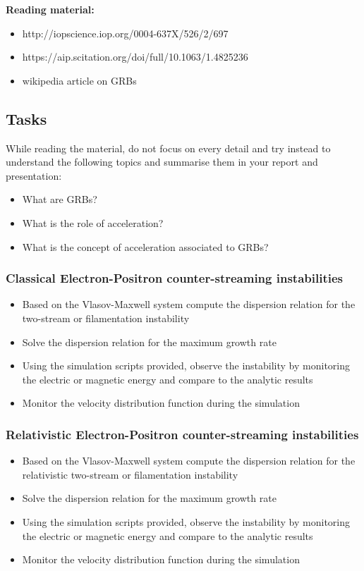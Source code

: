 \documentclass[11pt]{article}
\begin{document}
\textbf{Reading material:}
\begin{itemize}
\item http://iopscience.iop.org/0004-637X/526/2/697
\item https://aip.scitation.org/doi/full/10.1063/1.4825236
\item wikipedia article on GRBs
\end{itemize}

\subsection{Tasks}

While reading the material, do not focus on every detail and try instead to 
understand the following topics and summarise them in your report and presentation:
\begin{itemize}
\item What are GRBs?
\item What is the role of acceleration?
\item What is the concept of acceleration associated to GRBs?
\end{itemize}

\subsubsection{Classical Electron-Positron counter-streaming instabilities}
\begin{itemize}
\item Based on the Vlasov-Maxwell system compute the dispersion relation for the two-stream or filamentation instability
\item Solve the dispersion relation for the maximum growth rate
\item Using the simulation scripts provided, observe the instability by monitoring 
the electric or magnetic energy and compare to the analytic results
\item  Monitor the velocity distribution function during the simulation
\end{itemize}

\subsubsection{Relativistic Electron-Positron counter-streaming instabilities}
\begin{itemize}
\item Based on the Vlasov-Maxwell system compute the dispersion relation for the relativistic two-stream or filamentation instability
\item Solve the dispersion relation for the maximum growth rate
\item Using the simulation scripts provided, observe the instability by monitoring 
the electric or magnetic energy and compare to the analytic results
\item  Monitor the velocity distribution function during the simulation
\end{itemize}
\end{document}
